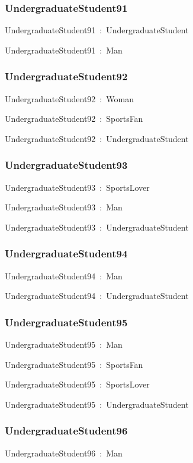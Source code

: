 \documentclass{article}
\begin{document}
\subsubsection*{UndergraduateStudent91}

UndergraduateStudent91~:~UndergraduateStudent

UndergraduateStudent91~:~Man

\subsubsection*{UndergraduateStudent92}

UndergraduateStudent92~:~Woman

UndergraduateStudent92~:~SportsFan

UndergraduateStudent92~:~UndergraduateStudent

\subsubsection*{UndergraduateStudent93}

UndergraduateStudent93~:~SportsLover

UndergraduateStudent93~:~Man

UndergraduateStudent93~:~UndergraduateStudent

\subsubsection*{UndergraduateStudent94}

UndergraduateStudent94~:~Man

UndergraduateStudent94~:~UndergraduateStudent

\subsubsection*{UndergraduateStudent95}

UndergraduateStudent95~:~Man

UndergraduateStudent95~:~SportsFan

UndergraduateStudent95~:~SportsLover

UndergraduateStudent95~:~UndergraduateStudent

\subsubsection*{UndergraduateStudent96}

UndergraduateStudent96~:~Man
\end{document}
